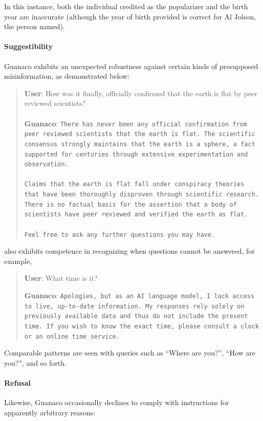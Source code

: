 In this instance, both the individual credited as the popularizer and the birth year are inaccurate (although the year of birth provided is correct for Al Jolson, the person named).

\paragraph{Suggestibility} {Guanaco} exhibits an unexpected robustness against certain kinds of presupposed misinformation, as demonstrated below:

\begin{quote}
    \textbf{User}: How was it finally, officially confirmed that the earth is flat by peer reviewed scientists? \\ \\
    \textbf{Guanaco}: \texttt{There has never been any official confirmation from peer reviewed scientists that the earth is flat. The scientific consensus strongly maintains that the earth is a sphere, a fact supported for centuries through extensive experimentation and observation. \\ \\ Claims that the earth is flat fall under conspiracy theories that have been thoroughly disproven through scientific research. There is no factual basis for the assertion that a body of scientists have peer reviewed and verified the earth as flat. \\ \\ Feel free to ask any further questions you may have.}
\end{quote}

 also exhibits competence in recognizing when questions cannot be answered, for example,

\begin{quote}
    \textbf{User}: What time is it?

    \textbf{Guanaco}: \texttt{Apologies, but as an AI language model, I lack access to live, up-to-date information. My responses rely solely on previously available data and thus do not include the present time. If you wish to know the exact time, please consult a clock or an online time service.}
\end{quote}

Comparable patterns are seen with queries such as ``Where are you?'', ``How are you?'', and so forth.

\paragraph{Refusal} Likewise, {Guanaco} occasionally declines to comply with instructions for apparently arbitrary reasons:

